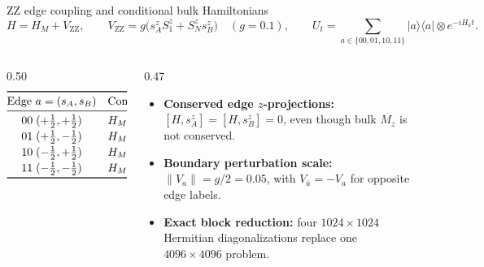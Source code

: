\documentclass[aspectratio=169,11pt]{beamer}
\newcommand{\ket}[1]{\lvert #1\rangle}
\newcommand{\bra}[1]{\langle #1\rvert}
\newcommand{\ZZ}{\mathrm{ZZ}}
\begin{document}
\begin{frame}{ZZ edge coupling and conditional bulk Hamiltonians}
\small
\[
H = H_M + V_{\ZZ},\qquad V_{\ZZ}=g\bigl(s_A^z S_1^z + S_N^z s_B^z\bigr)\quad(g=0.1),\qquad
U_t = \sum_{a\in\{00,01,10,11\}} \ket a\bra a \otimes e^{-iH_a t}.
\]
\begin{columns}[T,totalwidth=\textwidth]
\begin{column}{0.50\textwidth}
\footnotesize
\[
\begin{array}{@{}c@{\quad}l@{}}
\toprule
\text{Edge }a=(s_A,s_B) & \text{Conditional } H_a = H_M + V_a \\\midrule
00\;(+\tfrac12,+\tfrac12) & H_M + \tfrac{g}{2}S_1^z + \tfrac{g}{2}S_N^z \\[2pt]
01\;(+\tfrac12,-\tfrac12) & H_M + \tfrac{g}{2}S_1^z - \tfrac{g}{2}S_N^z \\[2pt]
10\;(-\tfrac12,+\tfrac12) & H_M - \tfrac{g}{2}S_1^z + \tfrac{g}{2}S_N^z \\[2pt]
11\;(-\tfrac12,-\tfrac12) & H_M - \tfrac{g}{2}S_1^z - \tfrac{g}{2}S_N^z \\\bottomrule
\end{array}
\]
\end{column}
\begin{column}{0.47\textwidth}
\footnotesize
\begin{itemize}\setlength\itemsep{4pt}
\item \textbf{Conserved edge $z$-projections:} $[H,s_A^z]=[H,s_B^z]=0$, even though bulk $M_z$ is not conserved.
\item \textbf{Boundary perturbation scale:} $\lVert V_a\rVert = g/2 = 0.05$, with $V_{\bar a}=-V_a$ for opposite edge labels.
\item \textbf{Exact block reduction:} four $1024\times 1024$ Hermitian diagonalizations replace one $4096\times 4096$ problem.
\end{itemize}
\end{column}
\end{columns}
\end{frame}
\end{document}

